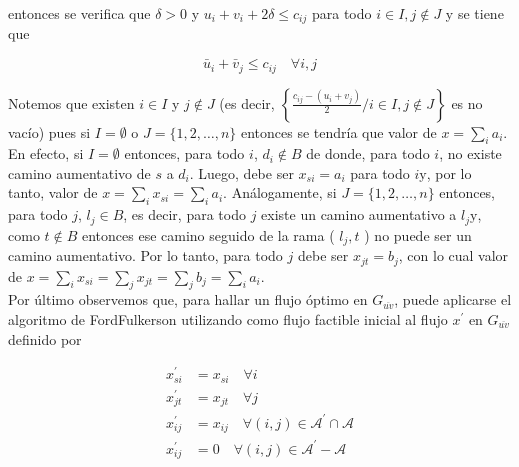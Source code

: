 \documentclass[10pt]{article}
\begin{document}
entonces se verifica que $\delta>0$ y $u_{i}+v_{i}+2 \delta \leq c_{i j}$ para todo $i \in I, j \notin J$ y se tiene que

$$
\bar{u}_{i}+\bar{v}_{j} \leq c_{i j} \quad \forall i, j
$$

Notemos que existen $i \in I$ y $j \notin J$ (es decir, $\left\{\frac{c_{i j}-\left(u_{i}+v_{j}\right)}{2} / i \in I, j \notin J\right\}$ es no vacío) pues si $I=\emptyset$ o $J=\{1,2, \ldots, n\}$ entonces se tendría que valor de $x=\sum_{i} a_{i}$. En efecto, si $I=\emptyset$ entonces, para todo $i$, $d_{i} \notin B$ de donde, para todo $i$, no existe camino aumentativo de $s$ a $d_{i}$. Luego, debe ser $x_{s i}=a_{i}$ para todo $i \mathrm{y}$, por lo tanto, valor de $x=\sum_{i} x_{s i}=\sum_{i} a_{i}$. Análogamente, si $J=\{1,2, \ldots, n\}$ entonces, para todo $j$, $l_{j} \in B$, es decir, para todo $j$ existe un camino aumentativo a $l_{j} \mathrm{y}$, como $t \notin B$ entonces ese camino seguido de la rama ( $l_{j}, t$ ) no puede ser un camino aumentativo. Por lo tanto, para todo $j$ debe ser $x_{j t}=b_{j}$, con lo cual valor de $x=\sum_{i} x_{s i}=\sum_{j} x_{j t}=\sum_{j} b_{j}=\sum_{i} a_{i}$.\\
Por último observemos que, para hallar un flujo óptimo en $G_{\overline{u v}}$, puede aplicarse el algoritmo de FordFulkerson utilizando como flujo factible inicial al flujo $x^{\prime}$ en $G_{\overline{u v}}$ definido por

$$
\begin{aligned}
x_{s i}^{\prime} & =x_{s i} \quad \forall i \\
x_{j t}^{\prime} & =x_{j t} \quad \forall j \\
x_{i j}^{\prime} & =x_{i j} \quad \forall(i, j) \in \mathcal{A}^{\prime} \cap \mathcal{A} \\
x_{i j}^{\prime} & =0 \quad \forall(i, j) \in \mathcal{A}^{\prime}-\mathcal{A}
\end{aligned}
$$
\end{document}
